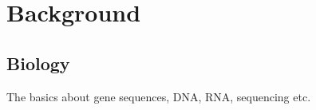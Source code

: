 \section{Background}

\subsection{Biology}
The basics about gene sequences, DNA, RNA, sequencing etc. %
